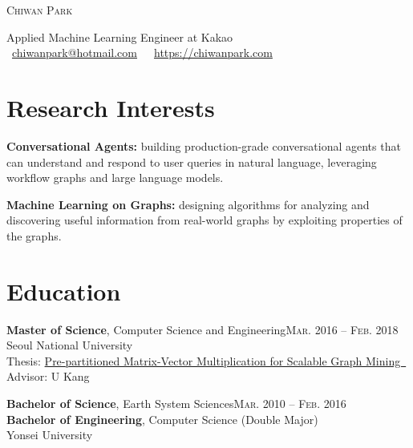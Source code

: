 \documentclass[11pt,a4paper]{article}
\makeatletter
\def\myname{Chiwan Park}
\def\myemail{chiwanpark@hotmail.com}
\def\myhomepage{https://chiwanpark.com}
\newenvironment{entry}{
  \begin{list}{}{
    \setlength{\leftmargin}{0em}
    \setlength{\itemsep}{0.25em}
    \setlength{\parskip}{0pt}
    \setlength{\parsep}{0.25em}
  }
}{
  \end{list}
}
\let\orighref\href
\renewcommand{\href}[2]{\orighref{#1}{#2\ {\scriptsize\faIcon{external-link-alt}}}}
\makeatother
\begin{document}
\begin{minipage}[t]{0.375\textwidth}
    \vspace{0pt}
    \Huge
    \textsc{\myname}
\end{minipage}
\hfill
\begin{minipage}[t]{0.6\textwidth}
  \vspace{0pt}
  Applied Machine Learning Engineer at Kakao\\
  {\scriptsize{}}\ \orighref{mailto:\myemail}{\myemail}\ \ {\scriptsize{}}\ \orighref{\myhomepage}{\myhomepage}
\end{minipage}

\section*{Research Interests}
\begin{entry}
  \item \textbf{Conversational Agents:} building production-grade conversational agents that can understand and respond to user queries in natural language, leveraging workflow graphs and large language models.
  \item \textbf{Machine Learning on Graphs:} designing algorithms for analyzing and discovering useful information from real-world graphs by exploiting properties of the graphs.
\end{entry}

\section*{Education}
\begin{entry}
  \item \textbf{Master of Science}, Computer Science and Engineering\hfill\textsc{Mar. 2016 -- Feb. 2018}\\
        Seoul National University\\
        Thesis: \href{https://s-space.snu.ac.kr/bitstream/10371/141560/1/000000151119.pdf}{Pre-partitioned Matrix-Vector Multiplication for Scalable Graph Mining}\\
        Advisor: U Kang
  \item \textbf{Bachelor of Science}, Earth System Sciences\hfill\textsc{Mar. 2010 -- Feb. 2016}\\
        \textbf{Bachelor of Engineering}, Computer Science (Double Major)\\
        Yonsei University
\end{entry}
\end{document}
